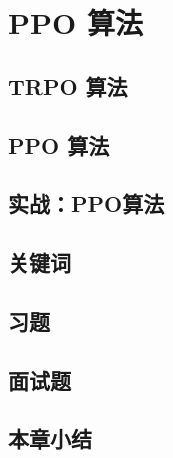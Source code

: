 
\section{ PPO 算法}
\subsection{ TRPO 算法}
\subsection{ PPO 算法}
\subsection{实战：PPO算法}


\subsection{关键词}
\subsection{习题}
\subsection{面试题}
\subsection{本章小结}